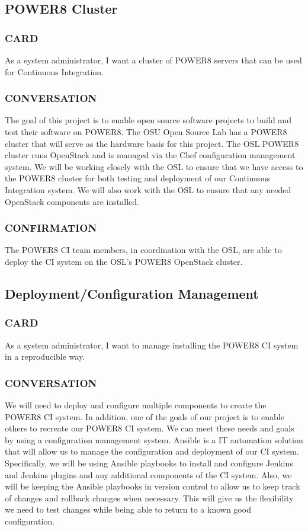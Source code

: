 \documentclass[10pt,letterpaper,onecolumn,journal]{IEEEtran}
\begin{document}
\subsection{POWER8 Cluster}
\subsubsection{CARD}
As a system administrator, I want a cluster of POWER8 servers that can be used for Continuous Integration.
\subsubsection{CONVERSATION}
The goal of this project is to enable open source software projects to build and test their software on POWER8.
The OSU Open Source Lab has a POWER8 cluster that will serve as the hardware basis for this project.
The OSL POWER8 cluster runs OpenStack and is managed via the Chef configuration management system.
We will be working closely with the OSL to ensure that we have access to the POWER8 cluster for both testing and deployment of our Continuous Integration system.
We will also work with the OSL to ensure that any needed OpenStack components are installed.
\subsubsection{CONFIRMATION}
The POWER8 CI team members, in coordination with the OSL, are able to deploy the CI system on the OSL's POWER8 OpenStack cluster.

\subsection{Deployment/Configuration Management}
\subsubsection{CARD}
As a system administrator, I want to manage installing the POWER8 CI system in a reproducible way.
\subsubsection{CONVERSATION}
We will need to deploy and configure multiple components to create the POWER8 CI system.
In addition, one of the goals of our project is to enable others to recreate our POWER8 CI system.
We can meet these needs and goals by using a configuration management system.
Ansible is a IT automation solution that will allow us to manage the configuration and deployment of our CI system.
Specifically, we will be using Ansible playbooks to install and configure Jenkins and Jenkins plugins and any additional components of the CI system.
Also, we will be keeping the Ansible playbooks in version control to allow us to keep track of changes and rollback changes when necessary.
This will give us the flexibility we need to test changes while being able to return to a known good configuration.
\end{document}
